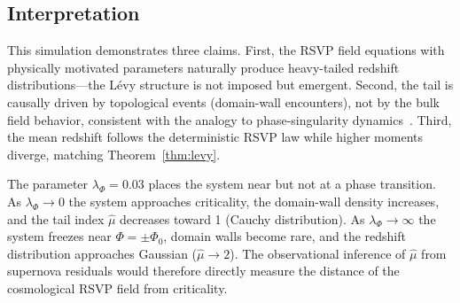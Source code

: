 \documentclass[12pt,a4paper]{article}
\theoremstyle{remark}
\begin{document}
\subsection{Interpretation}

This simulation demonstrates three claims. First, the RSVP field equations
with physically motivated parameters naturally produce heavy-tailed redshift
distributions---the Lévy structure is not imposed but emergent. Second, the
tail is causally driven by topological events (domain-wall encounters), not
by the bulk field behavior, consistent with the analogy to phase-singularity
dynamics~\cite{bucher2026}. Third, the mean redshift follows the deterministic
RSVP law while higher moments diverge, matching Theorem~\ref{thm:levy}.

The parameter $\lambda_\Phi = 0.03$ places the system near but not at a
phase transition. As $\lambda_\Phi \to 0$ the system approaches criticality,
the domain-wall density increases, and the tail index $\hat{\mu}$ decreases
toward 1 (Cauchy distribution). As $\lambda_\Phi \to \infty$ the system
freezes near $\Phi = \pm\Phi_0$, domain walls become rare, and the redshift
distribution approaches Gaussian ($\hat{\mu} \to 2$). The observational
inference of $\hat{\mu}$ from supernova residuals would therefore directly
measure the distance of the cosmological RSVP field from criticality.
\end{document}

